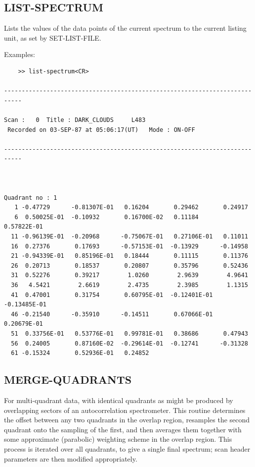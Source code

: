 \documentclass[11pt,twoside]{report}
\begin{document}
\subsection{LIST-SPECTRUM} 

Lists the values of the data points of the current spectrum to the current
listing unit, as set by SET-LIST-FILE. 

Examples:
\begin{verbatim}
    >> list-spectrum<CR>

---------------------------------------------------------------------------

Scan :   0  Title : DARK_CLOUDS     L483      
 Recorded on 03-SEP-87 at 05:06:17(UT)   Mode : ON-OFF

---------------------------------------------------------------------------



Quadrant no : 1
   1 -0.47729      -0.81307E-01   0.16204       0.29462       0.24917    
   6  0.50025E-01  -0.10932       0.16700E-02   0.11184       0.57822E-01
  11 -0.96139E-01  -0.20968      -0.75067E-01   0.27106E-01   0.11011    
  16  0.27376       0.17693      -0.57153E-01  -0.13929      -0.14958    
  21 -0.94339E-01   0.85196E-01   0.18444       0.11115       0.11376    
  26  0.20713       0.18537       0.20807       0.35796       0.52436    
  31  0.52276       0.39217        1.0260        2.9639        4.9641    
  36   4.5421        2.6619        2.4735        2.3985        1.1315    
  41  0.47001       0.31754       0.60795E-01  -0.12401E-01  -0.13485E-01
  46 -0.21540      -0.35910      -0.14511       0.67066E-01   0.20679E-01
  51  0.33756E-01   0.53776E-01   0.99781E-01   0.38686       0.47943    
  56  0.24005       0.87160E-02  -0.29614E-01  -0.12741      -0.31328    
  61 -0.15324       0.52936E-01   0.24852    
\end{verbatim}

\subsection{MERGE-QUADRANTS} 

For multi-quadrant data, with identical quadrants as might be produced by
overlapping sectors of an autocorrelation spectrometer. This routine determines the
offset between any two quadrants in the overlap region, resamples the
second quadrant onto the sampling of the first, and then averages them
together with some approximate (parabolic) weighting scheme in the overlap
region. This process is iterated over all quadrants, to give a single final
spectrum; scan header parameters are then modified appropriately.
\end{document}
